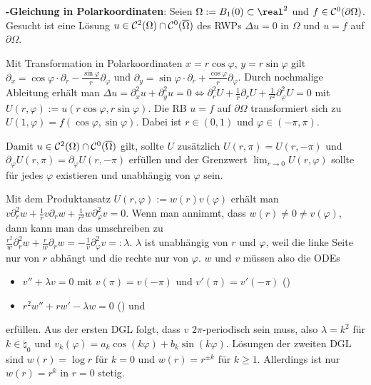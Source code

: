 \textbf{-Gleichung in Polarkoordinaten}:
Seien $\Omega := B_1(0) \subset \real^2$ und $f \in \mathcal{C}^0(\partial\Omega)$.\\
Gesucht ist eine Lösung $u \in \mathcal{C}^2(\Omega) \cap \mathcal{C}^0(\overline{\Omega})$ des RWPs
$\Delta u = 0$ in $\Omega$ und $u = f$ auf $\partial\Omega$.

Mit Transformation in Polarkoordinaten $x = r\cos\varphi$, $y = r\sin\varphi$ gilt
$\partial_x = \cos\varphi \cdot \partial_r - \frac{\sin\varphi}{r} \partial_\varphi$ und
$\partial_y = \sin\varphi \cdot \partial_r + \frac{\cos\varphi}{r} \partial_\varphi$.
Durch nochmalige Ableitung erhält man
$\Delta u = \partial_x^2 u + \partial_y^2 u = 0 \iff
\partial_r^2 U + \frac{1}{r} \partial_r U + \frac{1}{r^2} \partial_\varphi^2 U = 0$
mit $U(r, \varphi) := u(r\cos\varphi, r\sin\varphi)$.
Die RB $u = f$ auf $\partial\Omega$ transformiert sich zu
$U(1, \varphi) = f(\cos\varphi, \sin\varphi)$.
Dabei ist $r \in (0, 1)$ und $\varphi \in (-\pi, \pi)$.

Damit $u \in \mathcal{C}^2(\Omega) \cap \mathcal{C}^0(\overline{\Omega})$ gilt, sollte $U$ zusätzlich
$U(r, \pi) = U(r, -\pi)$ und\\
$\partial_\varphi U(r, \pi) = \partial_\varphi U(r, -\pi)$
erfüllen und der Grenzwert $\lim_{r \to 0} U(r, \varphi)$ sollte für jedes $\varphi$ existieren
und unabhängig von $\varphi$ sein.

Mit dem Produktansatz $U(r, \varphi) := w(r) v(\varphi)$ erhält man
$v \partial_r^2 w + \frac{1}{r} v \partial_r w + \frac{1}{r^2} w \partial_\varphi^2 v = 0$.
Wenn man annimmt, dass $w(r) \not= 0 \not= v(\varphi)$, dann kann man das umschreiben zu\\
$\frac{r^2}{w} \partial_r^2 w + \frac{r}{w} \partial_r w = -\frac{1}{v} \partial_\varphi^2 v =:
\lambda$.
$\lambda$ ist unabhängig von $r$ und $\varphi$, weil die linke Seite nur von $r$ abhängt und
die rechte nur von $\varphi$.
$w$ und $v$ müssen also die ODEs
\begin{itemize}
    \item
    $v'' + \lambda v = 0$
    mit $v(\pi) = v(-\pi)$ und $v'(\pi) = v'(-\pi)$
    ()

    \item
    $r^2 w'' + rw' - \lambda w = 0$
    () und
\end{itemize}
erfüllen.
Aus der ersten DGL folgt, dass $v$ $2\pi$-periodisch sein muss,
also $\lambda = k^2$ für $k \in \natural_0$ und
$v_k(\varphi) = a_k \cos(k\varphi) + b_k \sin(k\varphi)$.
Lösungen der zweiten DGL sind $w(r) = \log r$ für $k = 0$ und $w(r) = r^{\pm k}$ für $k \ge 1$.
Allerdings ist nur $w(r) = r^k$ in $r = 0$ stetig.


